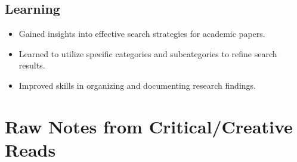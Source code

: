 \documentclass{article}
\begin{document}
\subsection{Learning}
\begin{itemize}
    \item Gained insights into effective search strategies for academic papers.
    \item Learned to utilize specific categories and subcategories to refine search results.
    \item Improved skills in organizing and documenting research findings.
\end{itemize}

\section{Raw Notes from Critical/Creative Reads}
\end{document}
